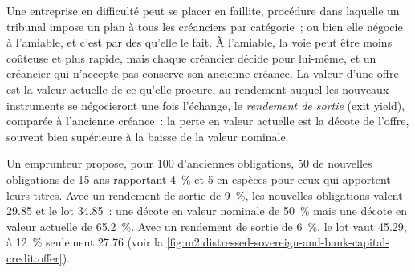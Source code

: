 Une entreprise en difficulté peut se placer en faillite, procédure dans laquelle un tribunal impose un plan à tous
les créanciers par catégorie~; ou bien elle négocie à l'amiable, et c'est par des  qu'elle le fait.
À l'amiable, la voie peut être moins coûteuse et plus rapide, mais chaque créancier décide pour lui-même, et un
créancier qui n'accepte pas conserve son ancienne créance. La valeur d'une offre est la valeur actuelle
de ce qu'elle procure, au rendement auquel les nouveaux instruments se négocieront une fois
l'échange, le \emph{rendement de sortie} (exit yield), comparée à l'ancienne créance~: la perte
en valeur actuelle est la décote de l'offre, souvent bien supérieure à la baisse de la valeur nominale.

\begin{example}\label{ex:m2:distressed-sovereign-and-bank-capital-credit:offer}
Un emprunteur propose, pour 100 d'anciennes obligations, 50 de nouvelles obligations de 15 ans rapportant 4~\% et 5 en
espèces pour ceux qui apportent leurs titres. Avec un rendement de sortie de 9~\%, les nouvelles obligations valent 29.85 et
le lot 34.85~: une décote en valeur nominale de 50~\% mais une décote en valeur actuelle de 65.2~\%.
Avec un rendement de sortie de 6~\%, le lot vaut 45.29, à 12~\% seulement 27.76
(voir la \cref{fig:m2:distressed-sovereign-and-bank-capital-credit:offer}).
\end{example}

